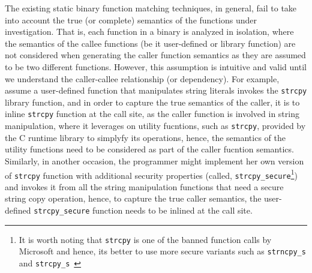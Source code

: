 The existing static binary function matching techniques, in general, fail to take into account the true (or complete) semantics of the functions under investigation. That is, each function in a binary is analyzed in isolation, where the semantics of the callee functions (be it user-defined or library function) are not considered when generating the caller function semantics as they are assumed to be two different functions. However, this assumption is intuitive and valid until we understand the caller-callee relationship (or dependency). For example, assume a user-defined function that manipulates string literals invokes the \texttt{strcpy} library function, and in order to capture the true semantics of the caller, it is  to inline \texttt{strcpy} function at the call site, as the caller function is involved in string manipulation, where it leverages on utility fucntions, such as \texttt{strcpy}, provided by the C runtime library to simplyfy its operations, hence, the semantics of the utility functions need to be considered as part of the caller fucntion semantics. Similarly, in another occasion, the programmer might implement her own version of \texttt{strcpy} function with additional security properties (called, \texttt{strcpy\_secure}\footnote{It is worth noting that \texttt{strcpy} is one of the banned function calls by Microsoft and hence, its better to use more secure variants such as \texttt{strncpy\_s} and \texttt{strcpy\_s}~\cite{msbannedfunctioncalls}}) and invokes it from all the string manipulation functions that need a secure string copy operation, hence, to capture the true caller semantics, the user-defined \texttt{strcpy\_secure} function needs to be inlined at the call site.





